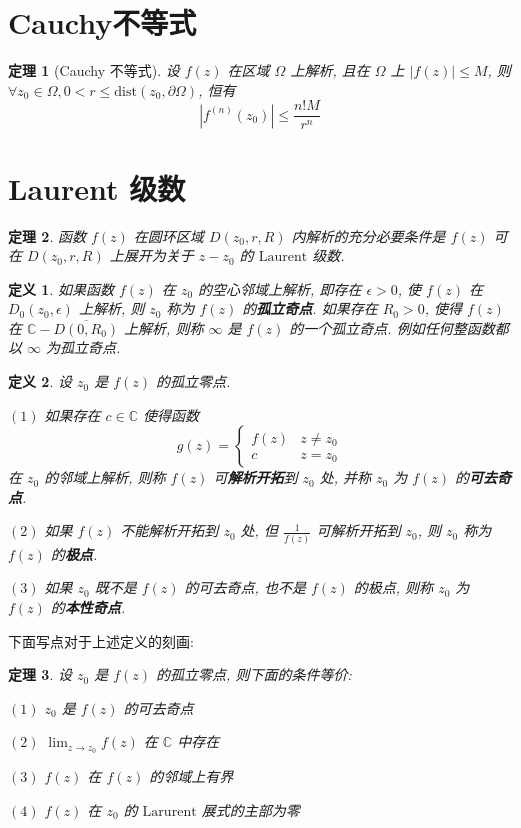 \documentclass[12pt,a4paper]{article}
\newtheorem{thm}{定理}[section]  %
\newtheorem{definition}{定义}[section] %
\begin{document}
\section{Cauchy不等式}

\begin{thm}[Cauchy 不等式]
    设 $f(z)$ 在区域 $\Omega$ 上解析, 且在 $\Omega$ 上 $|f(z)| \leq M$, 则 $\forall z_0 \in \Omega, 0 < r \leq \mathrm{dist}(z_0, \partial \Omega)$, 恒有
    \[ |f^{(n)}(z_0)| \leq \frac{n!M}{r^n}\]
\end{thm}


\section{Laurent 级数}

\begin{thm}
 函数 $f(z)$ 在圆环区域 $D(z_0, r, R)$ 内解析的充分必要条件是 $f(z)$ 可在 $D(z_0, r, R)$ 上展开为关于 $z-z_0$ 的 $\mathrm{Laurent}$ 级数.
\end{thm}

\begin{definition}
    如果函数 $f(z)$ 在 $z_0$ 的空心邻域上解析, 即存在 $\epsilon > 0$, 使 $f(z)$ 在 $D_0(z_0, \epsilon)$ 上解析, 则 $z_0$ 称为 $f(z)$ 的\textbf{孤立奇点}. 
    如果存在 $R_0>0$, 使得 $f(z)$ 在 $\mathbb{C} - \overline{D(0, R_0)}$ 上解析, 则称 $\infty$ 是 $f(z)$ 的一个孤立奇点. 例如任何整函数都以 $\infty$ 为孤立奇点.
\end{definition}

\begin{definition}
    设 $z_0$ 是 $f(z)$ 的孤立零点.
    
    $(1)$ 如果存在 $c \in \mathbb{C}$ 使得函数 \[g(z) = \begin{cases}f(z) & z \neq z_0 \\ c & z = z_0 \end{cases}\] 
    在 $z_0$ 的邻域上解析, 则称 $f(z)$ 可\textbf{解析开拓}到 $z_0$ 处, 并称 $z_0$ 为 $f(z)$ 的\textbf{可去奇点}.

    $(2)$ 如果 $f(z)$ 不能解析开拓到 $z_0$ 处, 但 $\frac{1}{f(z)}$ 可解析开拓到 $z_0$, 则 $z_0$ 称为 $f(z)$ 的\textbf{极点}.

    $(3)$ 如果 $z_0$ 既不是 $f(z)$ 的可去奇点, 也不是 $f(z)$ 的极点, 则称 $z_0$ 为 $f(z)$ 的\textbf{本性奇点}.
\end{definition}

下面写点对于上述定义的刻画:

\begin{thm}
    设 $z_0$ 是 $f(z)$ 的孤立零点, 则下面的条件等价:

    $(1)$ $z_0$ 是 $f(z)$ 的可去奇点

    $(2)$ $\lim_{z \to z_0} f(z)$ 在 $\mathbb{C}$ 中存在

    $(3)$ $f(z)$ 在 $f(z)$ 的邻域上有界

    $(4)$ $f(z)$ 在 $z_0$ 的 $\mathrm{Larurent}$ 展式的主部为零
\end{thm}
\end{document}
